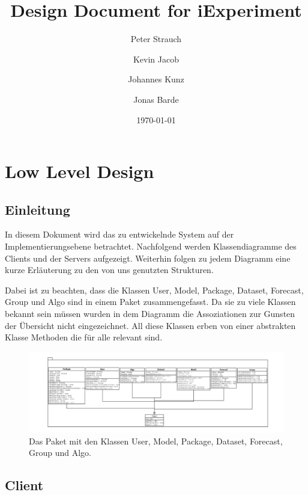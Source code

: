 \documentclass[oneside]{book}
\title{Design Document for iExperiment}
\author{Peter Strauch \and Kevin Jacob \and Johannes Kunz \and Jonas Barde}
\date{\today}
\begin{document}
\frontmatter
\maketitle
\tableofcontents
\mainmatter
\part{Low Level Design}

\chapter{Einleitung}
 In diesem Dokument wird das zu entwickelnde System auf der Implementierungsebene betrachtet. Nachfolgend werden Klassendiagramme des Clients und der Servers aufgezeigt. Weiterhin folgen zu jedem Diagramm eine kurze Erl\"auterung zu den von uns genutzten Strukturen. 
 
 Dabei ist zu beachten, dass die Klassen User, Model, Package, Dataset, Forecast, Group und Algo sind in einem Paket zusammengefasst. Da sie zu viele Klassen bekannt sein m\"ussen wurden in dem Diagramm die Assoziationen zur Gunsten der \"Ubersicht nicht eingezeichnet. All diese Klassen erben von einer abstrakten Klasse Methoden die f\"ur alle relevant sind.
 \begin{figure}[ht]
 	\centering
 	\includegraphics[scale=0.4]{Paket.png}
 	\caption{Das Paket mit den Klassen User, Model, Package, Dataset, Forecast, Group und Algo.}
 \end{figure}
 
 
\chapter{Client}
\end{document}
